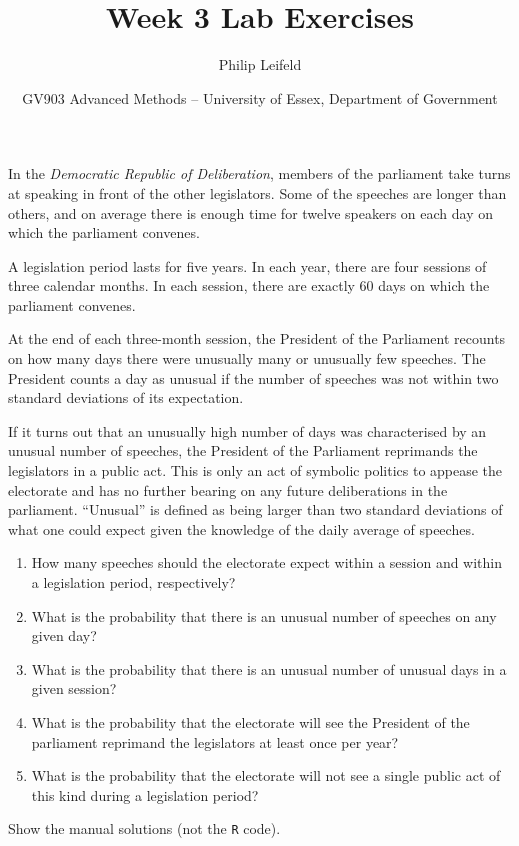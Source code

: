 \documentclass[a4paper,11pt]{article}
\title{Week 3 Lab Exercises}
\author{Philip Leifeld}
\date{GV903 Advanced Methods -- University of Essex, Department of Government}
\begin{document}
\maketitle

In the \emph{Democratic Republic of Deliberation}, members of the parliament take turns at speaking in front of the other legislators. Some of the speeches are longer than others, and on average there is enough time for twelve speakers on each day on which the parliament convenes.

A legislation period lasts for five years. In each year, there are four sessions of three calendar months. In each session, there are exactly 60 days on which the parliament convenes.

At the end of each three-month session, the President of the Parliament recounts on how many days there were unusually many or unusually few speeches. The President counts a day as unusual if the number of speeches was not within two standard deviations of its expectation.

If it turns out that an unusually high number of days was characterised by an unusual number of speeches, the President of the Parliament reprimands the legislators in a public act. This is only an act of symbolic politics to appease the electorate and has no further bearing on any future deliberations in the parliament. ``Unusual'' is defined as being larger than two standard deviations of what one could expect given the knowledge of the daily average of speeches.

\begin{enumerate}
 \item How many speeches should the electorate expect within a session and within a legislation period, respectively?
 \item What is the probability that there is an unusual number of speeches on any given day?
 \item What is the probability that there is an unusual number of unusual days in a given session?
 \item What is the probability that the electorate will see the President of the parliament reprimand the legislators at least once per year?
 \item What is the probability that the electorate will not see a single public act of this kind during a legislation period?
\end{enumerate}
Show the manual solutions (not the \texttt{R} code).
\end{document}
